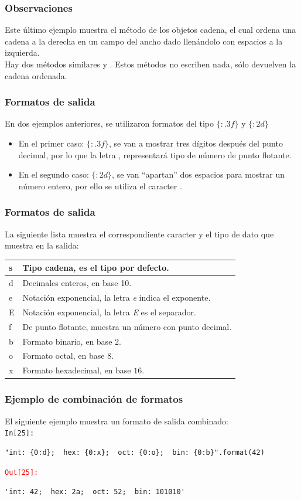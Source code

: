 \begin{frame}
\frametitle{Observaciones}
Este último ejemplo muestra el método  de los objetos cadena, el cual ordena una cadena a la derecha en un campo del ancho dado llenándolo con espacios a la izquierda.
\\
\bigskip
Hay dos métodos similares  y  . Estos métodos no escriben nada, sólo devuelven la cadena ordenada.
\end{frame}
\begin{frame}[fragile]
\frametitle{Formatos de salida}
En dos ejemplos anteriores, se utilizaron formatos del tipo
$\{ :.3f \}$ y $\{ :2d \}$
\\
\bigskip
\pause
\begin{itemize}[<+->]
\item En el primer caso: $\{ :.3f \}$, se van a mostrar tres dígitos después del punto decimal, por lo que la letra , representará tipo de número de punto flotante.
\item En el segundo caso: $\{ :2d \}$, se van \enquote{apartan} dos espacios para mostrar un número entero, por ello se utiliza el caracter .
\end{itemize}
\end{frame}
\begin{frame}
\frametitle{Formatos de salida}
\fontsize{12}{12}\selectfont
La siguiente lista muestra el correspondiente caracter y el tipo de dato que muestra en la salida:
\fontsize{11}{11}\selectfont
\begin{table}
\begin{tabular}{l | l}
s & Tipo cadena, es el tipo por defecto. \\ \hline
d & Decimales enteros, en base 10. \\ \hline
e & Notación exponencial, la letra \emph{e} indica el exponente. \\ \hline
E & Notación exponencial, la letra \emph{E} es el separador. \\ \hline
f & De punto flotante, muestra un número con punto decimal. \\ \hline
b & Formato binario, en base $2$. \\ \hline
o & Formato octal, en base $8$. \\ \hline
x & Formato hexadecimal, en base $16$.
\end{tabular}
\end{table}
\end{frame}
\begin{frame}[fragile]
\frametitle{Ejemplo de combinación de formatos}
El siguiente ejemplo muestra un formato de salida combinado:
\\
\bigskip
\textcolor{ao}{\texttt{In[25]: }} 
\begin{lstlisting}
"int: {0:d};  hex: {0:x};  oct: {0:o};  bin: {0:b}".format(42)
\end{lstlisting}
\pause
\textcolor{red}{\texttt{Out[25]: }} 
\begin{lstlisting}
'int: 42;  hex: 2a;  oct: 52;  bin: 101010'
\end{lstlisting}
\end{frame}
